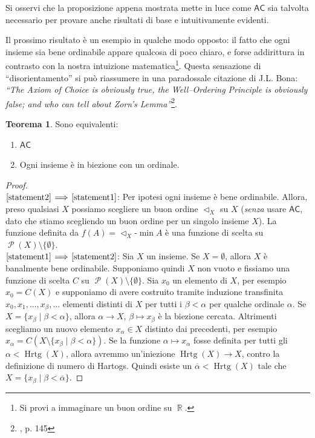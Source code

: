 \documentclass[12pt,a4paper]{report}
\theoremstyle{definition}
\newtheorem{teo}{Teorema}[section]  %
\theoremstyle{num.custom-title}
\DeclareMathOperator{\PP}{\mathcal{P}}
\DeclareMathOperator{\Hrtg}{\text{Hrtg}}
\DeclareMathOperator{\R}{\mathbb{R}}
\DeclareMathOperator{\sm}{\setminus}
\newcommand{\AC}{\ensuremath{\mathsf{AC}}\xspace}
\newcommand{\Implies}[2]{$\text{\ref{statement#1}}\!\implies\!\text{\ref{statement#2}}$}%
\newcommand{\punto}[1]{\item \label{statement#1}}
\newenvironment{equivalence}
    {\begin{enumerate}[label=(\arabic*),ref=(\arabic*)]
    }
    { 
	\end{enumerate}
    }
\begin{document}
Si osservi che la proposizione appena mostrata mette in luce come \AC sia talvolta necessario per provare anche risultati di base e intuitivamente evidenti.

Il prossimo risultato è un esempio in qualche modo opposto: il fatto che ogni insieme sia bene ordinabile appare qualcosa di poco chiaro, e forse addirittura in contrasto con la nostra intuizione matematica\footnote{Si provi a immaginare un buon ordine su $\R$.}. Questa sensazione di ``disorientamento'' si può riassumere in una paradossale citazione di J.L. Bona: \emph{``The Axiom of Choice is obviously true, the Well–Ordering Principle is obviously false; and who can tell about Zorn’s Lemma''}\footnote{\cite{Sch97:Herrlich}, p. 145}.

\begin{teo}\label{AC-WOT} Sono equivalenti:
\begin{equivalence}
\punto{1} \AC
\punto{2} Ogni insieme è in biezione con un ordinale.
\end{equivalence}
\begin{proof}\ \\
\Implies{2}{1}: Per ipotesi ogni insieme è bene ordinabile. Allora, preso qualsiasi $X$ possiamo scegliere un buon ordine $\vartriangleleft_X$ su $X$ (\emph{senza} usare \AC, dato che stiamo scegliendo un buon ordine per un singolo insieme $X$). La funzione definita da $f(A)=\vartriangleleft_X$-$\min A$ è una funzione di scelta su $\PP (X) \sm \{\emptyset\}$.\\
\Implies{1}{2}: Sia $X$ un insieme. Se $X = \emptyset$, allora $X$ è banalmente bene ordinabile. Supponiamo quindi $X$ non vuoto e fissiamo una funzione di scelta $C$ su $\PP (X) \sm \{\emptyset\}$. Sia $x_0$ un elemento di $X$, per esempio $x_0=C(X)$ e supponiamo di avere costruito tramite induzione transfinita $x_0, x_1, ..., x_\beta, ...$ elementi distinti di $X$ per tutti i $\beta < \alpha$ per qualche ordinale $\alpha$. Se $X=\{x_\beta \mid \beta < \alpha\}$, allora $\alpha \to X$, $\beta \mapsto x_\beta$ è la biezione cercata. Altrimenti scegliamo un nuovo elemento $x_\alpha \in X$ distinto dai precedenti, per esempio $x_\alpha = C(X \sm \{x_\beta \mid \beta < \alpha\})$. Se la funzione $\alpha \mapsto x_\alpha$ fosse definita per tutti gli $\alpha < \Hrtg(X)$, allora avremmo un'iniezione $\Hrtg(X) \to X$, contro la definizione di numero di Hartogs. Quindi esiste un $\overline{\alpha} < \Hrtg(X)$ tale che $X=\{x_\beta \mid \beta < \overline{\alpha}\}$.
\end{proof}
\end{teo}
\end{document}
